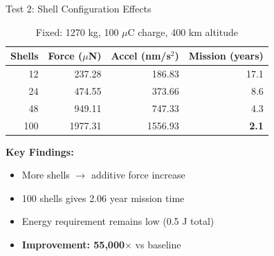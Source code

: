 \documentclass[11pt]{beamer}
\begin{document}
\begin{frame}{Test 2: Shell Configuration Effects}

\begin{table}[h]
\centering
\begin{tabular}{rrrr}
\toprule
\textbf{Shells} & \textbf{Force ($\mu$N)} & \textbf{Accel (nm/s$^2$)} & \textbf{Mission (years)} \\
\midrule
12 & 237.28 & 186.83 & 17.1 \\
24 & 474.55 & 373.66 & 8.6 \\
48 & 949.11 & 747.33 & 4.3 \\
\rowcolor{green!20}
100 & 1977.31 & 1556.93 & \textbf{2.1} \\
\bottomrule
\end{tabular}
\caption{Fixed: 1270 kg, 100 $\mu$C charge, 400 km altitude}
\end{table}

\vspace{0.3cm}

\textbf{Key Findings:}
\begin{itemize}
\item More shells $\rightarrow$ additive force increase
\item 100 shells gives 2.06 year mission time
\item Energy requirement remains low (0.5 J total)
\item \textbf{Improvement: 55,000$\times$} vs baseline
\end{itemize}

\end{frame}
\end{document}
